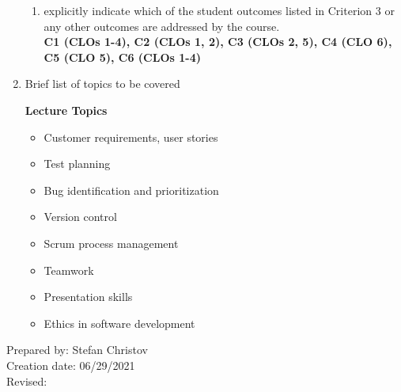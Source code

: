 \begin{enumerate}[1.]
\begin{enumerate}
\item explicitly indicate which of the student outcomes listed in Criterion 3 or any other outcomes are addressed by the course.\\
  {\bfseries
    C1 (CLOs 1-4),
    C2 (CLOs 1, 2),
    C3 (CLOs 2, 5),
    C4 (CLO 6), 
    C5 (CLO 5),
    C6 (CLOs 1-4)
  }
\end{enumerate}

\item Brief list of topics to be covered\\
  {\bfseries
    Lecture Topics
    \begin{itemize}
      \item Customer requirements, user stories
      \item Test planning
      \item Bug identification and prioritization
      \item Version control
      \item Scrum process management
      \item Teamwork
      \item Presentation skills
      \item Ethics in software development
    \end{itemize}
  }

\end{enumerate}

\noindent Prepared by: Stefan Christov\\
\noindent Creation date: 06/29/2021\\
\noindent Revised:\\
